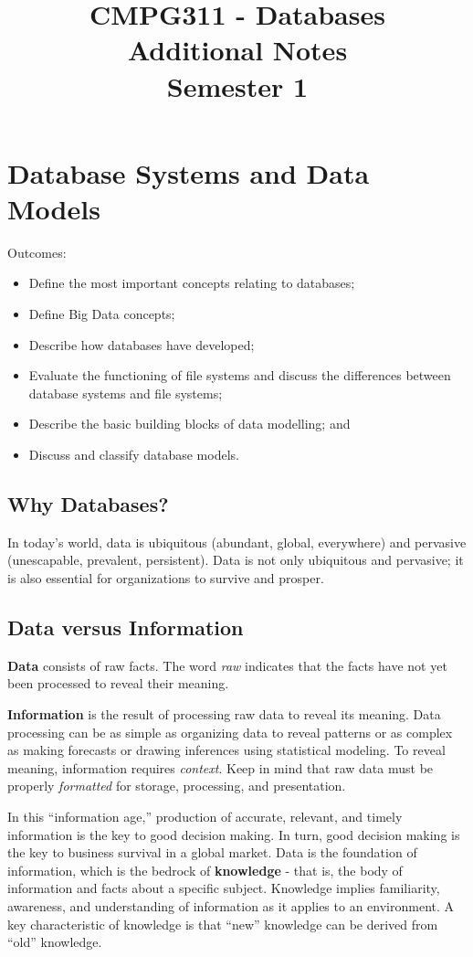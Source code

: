 \documentclass[a4paper, 12pt, titlepage]{report}
\begin{document}
\linespread{1.5}
\title{CMPG311 - Databases\\Additional Notes\\Semester 1}
\date{}
\maketitle
\tableofcontents{}

\chapter{Database Systems and Data Models}
Outcomes:
\begin{itemize}
\item Define the most important concepts relating to databases;
\item Define Big Data concepts;
\item Describe how databases have developed;
\item Evaluate the functioning of file systems and discuss the differences between database systems and file systems;
\item Describe the basic building blocks of data modelling; and
\item Discuss and classify database models.
\end{itemize}
\section{Why Databases?}
In today’s world, data is ubiquitous (abundant, global, everywhere) and pervasive (unescapable, prevalent, persistent). Data is not only ubiquitous and pervasive; it is also essential for organizations to survive and prosper.
\section{Data versus Information}
\textbf{Data} consists of raw facts. The word \emph{raw} indicates that the facts have not yet been processed to reveal their meaning.

\textbf{Information} is the result of processing raw data to reveal its meaning. Data processing can be as simple as organizing data to reveal patterns or as complex as making forecasts or drawing inferences using statistical modeling. To reveal meaning, information requires \emph{context}. Keep in mind that raw data must be properly \emph{formatted} for storage, processing, and presentation.

In this “information age,” production of accurate, relevant, and timely information is the key to good decision making. In turn, good decision making is the key to business survival in a global market.
Data is the foundation of information, which is the bedrock of \textbf{knowledge} - that is, the body of information and facts about a specific subject. Knowledge implies familiarity, awareness, and understanding of information as it applies to an environment. A key characteristic of knowledge is that “new” knowledge can be derived from “old” knowledge.
\end{document}
